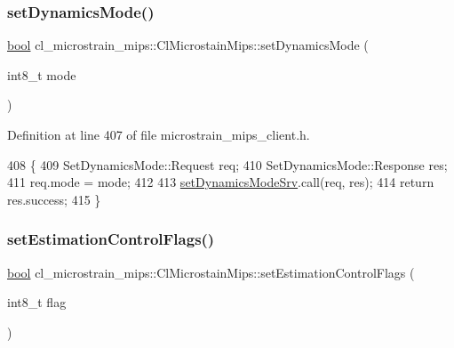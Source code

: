 \subsubsection{\texorpdfstring{set\+Dynamics\+Mode()}{setDynamicsMode()}}
{\footnotesize\ttfamily \hyperlink{classbool}{bool} cl\+\_\+microstrain\+\_\+mips\+::\+Cl\+Microstain\+Mips\+::set\+Dynamics\+Mode (\begin{DoxyParamCaption}\item[{int8\+\_\+t}]{mode }\end{DoxyParamCaption})\hspace{0.3cm}{\ttfamily [inline]}}



Definition at line 407 of file microstrain\+\_\+mips\+\_\+client.\+h.


\begin{DoxyCode}
408     \{
409         SetDynamicsMode::Request req;
410         SetDynamicsMode::Response res;
411         req.mode = mode;
412 
413         \hyperlink{classcl__microstrain__mips_1_1ClMicrostainMips_a43a684f4010debc4a2ba17d9784712d6}{setDynamicsModeSrv}.call(req, res);
414         \textcolor{keywordflow}{return} res.success;
415     \}
\end{DoxyCode}
\mbox{\label{classcl__microstrain__mips_1_1ClMicrostainMips_a8b5a76095196ef5a351804991ea9e23f}} 
\subsubsection{\texorpdfstring{set\+Estimation\+Control\+Flags()}{setEstimationControlFlags()}}
{\footnotesize\ttfamily \hyperlink{classbool}{bool} cl\+\_\+microstrain\+\_\+mips\+::\+Cl\+Microstain\+Mips\+::set\+Estimation\+Control\+Flags (\begin{DoxyParamCaption}\item[{int8\+\_\+t}]{flag }\end{DoxyParamCaption})\hspace{0.3cm}{\ttfamily [inline]}}



